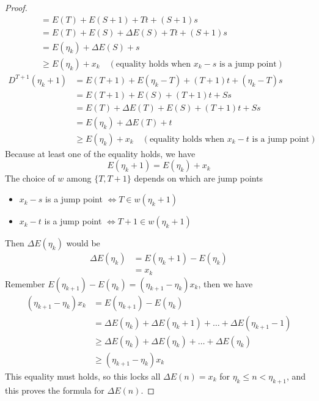 \documentclass[]{article}
\begin{document}
\begin{proof}
\begin{align*}
	&= E(T) + E(S+1) +Tt +(S+1)s\\
	&= E(T) + E(S) + \Delta E(S) +Tt +(S+1)s\\
	&= E(\eta_k) + \Delta E(S) +s \\
	&\geq E(\eta_k) + x_k \quad (\text{equality holds when $x_k-s$ is a jump point})
	\end{align*}
	\begin{align*}
	D^{T+1}(\eta_k+1) &= E(T+1) + E(\eta_k-T) +(T+1)t +(\eta_k-T)s \\
	&= E(T+1) + E(S) +(T+1)t +Ss \\
	&= E(T) + \Delta E(T)+ E(S) +  (T+1)t +Ss\\
	&= E(\eta_k) + \Delta E(T) +t \\
	&\geq E(\eta_k) + x_k \quad (\text{equality holds when $x_k-t$ is a jump point})
	\end{align*}
	Because at least one of the equality holds, we have
	\[
	E(\eta_k+1) =  E(\eta_k) + x_k
	\]
	The choice of $w$ among $\{T, T+1\}$ depends on which are jump points
	\begin{itemize}
		\item $x_k-s$ is a jump point $\iff T \in w(\eta_k+1)$ 
		\item $x_k-t$ is a jump point $\iff T+1 \in w(\eta_k+1)$ 
	\end{itemize}
	Then $\Delta E(\eta_k)$ would be 
	\begin{align*}
	\Delta E(\eta_k) &= E(\eta_k+1) - E(\eta_k) \\
	&= x_k 
	\end{align*}
	Remember $E(\eta_{k+1}) - E(\eta_k) = (\eta_{k+1} -\eta_k)x_k$, then we have 
	\begin{align*}
	(\eta_{k+1} -\eta_k)x_k &= E(\eta_{k+1}) - E(\eta_k) \\
	&= \Delta E(\eta_k) + \Delta E(\eta_k + 1) +\dots+\Delta E(\eta_{k+1} - 1) \\
	&\geq  \Delta E(\eta_k) + \Delta E(\eta_k) +\dots+\Delta E(\eta_k) \\
	&\geq (\eta_{k+1} -\eta_k)x_k
	\end{align*}
	This equality must holds, so this locks all $\Delta E(n) = x_k$ for $\eta_{k} \leq n < \eta_{k+1}$, and this proves the formula for $\Delta E(n)$.
	

\end{proof}
\end{document}
